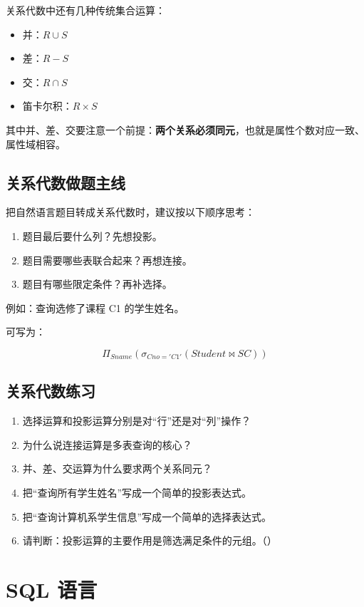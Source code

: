 \documentclass{../../note}
\begin{document}
关系代数中还有几种传统集合运算：

\begin{itemize}
  \item 并：$R \cup S$
  \item 差：$R - S$
  \item 交：$R \cap S$
  \item 笛卡尔积：$R \times S$
\end{itemize}

其中并、差、交要注意一个前提：\textbf{两个关系必须同元}，也就是属性个数对应一致、属性域相容。

\subsection{关系代数做题主线}

把自然语言题目转成关系代数时，建议按以下顺序思考：

\begin{enumerate}
  \item 题目最后要什么列？先想投影。
  \item 题目需要哪些表联合起来？再想连接。
  \item 题目有哪些限定条件？再补选择。
\end{enumerate}

例如：查询选修了课程 C1 的学生姓名。

可写为：

\[
\Pi_{Sname}(\sigma_{Cno='C1'}(Student \bowtie SC))
\]

\subsection{关系代数练习}

\begin{enumerate}
  \item 选择运算和投影运算分别是对“行”还是对“列”操作？
  \item 为什么说连接运算是多表查询的核心？
  \item 并、差、交运算为什么要求两个关系同元？
  \item 把“查询所有学生姓名”写成一个简单的投影表达式。
  \item 把“查询计算机系学生信息”写成一个简单的选择表达式。
  \item 请判断：投影运算的主要作用是筛选满足条件的元组。（\hspace{1cm}）
\end{enumerate}

\section{SQL 语言}
\end{document}
